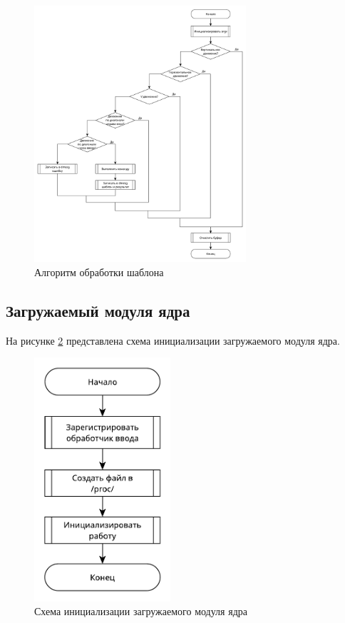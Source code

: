 \begin{figure}[H]
	\centering
	\includegraphics[width=0.7\textwidth]{inc/recognition.pdf}
	\caption{Алгоритм обработки шаблона}
	\label{fig:recognition}
\end{figure}

\clearpage

\subsection{Загружаемый модуля ядра}

На рисунке \ref{fig:module} представлена схема инициализации загружаемого модуля ядра.

\begin{figure}[H]
	\centering
	\includegraphics[width=0.45\textwidth]{inc/init.pdf}
	\caption{Схема инициализации загружаемого модуля ядра}
	\label{fig:module}
\end{figure}


\clearpage
